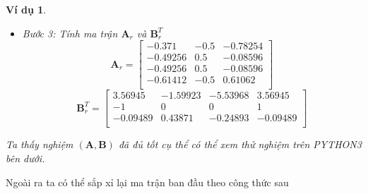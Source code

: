 \documentclass[12pt,a4paper,oneside]{report}
\newtheorem{vd}{Ví dụ} [section]
\numberwithin{equation}{section}
\begin{document}
\begin{vd}
\begin{itemize}
\[
\bar{\mathbf{X}}=\mathbf{UDV}^{T} = \begin{bmatrix}
-0.371 & -0.5 & -0.78254 & 0 \\
-0.49256 & 0.5 & -0.08596 & 0 \\
-0.49256 & 0.5 & -0.08596 & 0 \\
-0.61412 & -0.5 & 0.61062 & 0 \\
\end{bmatrix} \cdot \begin{bmatrix}
7.66339 & 0 & 0 & 0 \\
0 & 1.41421 & 0 & 0 \\
0 & 0 & 0.52196 & 0 \\
0 & 0 & 0 & 0 \\
\end{bmatrix}
\]
\[
\cdot \begin{bmatrix}
0.46578 & -0.20868 & -0.72288 & 0.46578 \\
-0.70711 & 0 & 0 & 0.70711 \\
-0.18179 & 0.84051 & -0.47692 & -0.18179 \\
0.5 & 0.5 & 0.5 & 0.5 \\
\end{bmatrix}
\]
\item Bước 3: Tính ma trận $\mathbf{A}_r $ và $\mathbf{B}_r^{T}$
\begin{equation}
	\mathbf{A}_r = \begin{bmatrix}
	-0.371 & -0.5 & -0.78254  \\
	-0.49256 & 0.5 & -0.08596 \\
	-0.49256 & 0.5 & -0.08596  \\
	-0.61412 & -0.5 & 0.61062 \\
\end{bmatrix}
\end{equation}
\begin{equation}
	\mathbf{B}_r^{T} =\begin{bmatrix}
3.56945 & -1.59923 & -5.53968 & 3.56945 \\
-1 & 0 & 0 & 1 \\
-0.09489 & 0.43871 & -0.24893 & -0.09489 \\
	\end{bmatrix}
\end{equation}
\end{itemize}
Ta thấy nghiệm $(\mathbf{A, B})$ đã đủ tốt cụ thể có thể xem thử nghiệm trên PYTHON3 bên dưới.
\end{vd}
Ngoài ra ta có thể sắp xỉ lại ma trận ban đầu theo công thức sau 
\end{document}
